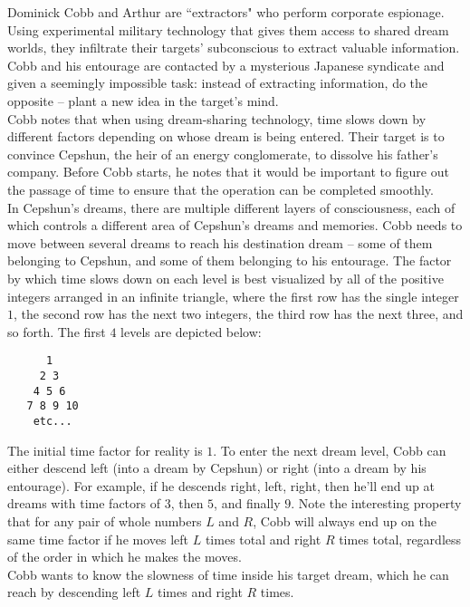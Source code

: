 
\noindent Dominick Cobb and Arthur are ``extractors" who perform corporate espionage. Using experimental military technology that gives them access to shared dream worlds, they infiltrate their targets' subconscious to extract valuable information. Cobb and his entourage are contacted by a mysterious Japanese syndicate and given a seemingly impossible task: instead of extracting information, do the opposite -- plant a new idea in the target's mind.\\

Cobb notes that when using dream-sharing technology, time slows down by different factors depending on whose dream is being entered. Their target is to convince Cepshun, the heir of an energy conglomerate, to dissolve his father's company. Before Cobb starts, he notes that it would be important to figure out the passage of time to ensure that the operation can be completed smoothly.\\

In Cepshun's dreams, there are multiple different layers of consciousness, each of which controls a different area of Cepshun's dreams and memories. Cobb needs to move between several dreams to reach his destination dream -- some of them belonging to Cepshun, and some of them belonging to his entourage. The factor by which time slows down on each level is best visualized by all of the positive integers arranged in an infinite triangle, where the first row has the single integer $1$, the second row has the next two integers, the third row has the next three, and so forth. The first $4$ levels are depicted below:

\begin{verbatim}
      1
     2 3
    4 5 6
   7 8 9 10
    etc...
\end{verbatim}

The initial time factor for reality is $1$. To enter the next dream level, Cobb can either descend left (into a dream by Cepshun) or right (into a dream by his entourage). For example, if he descends right, left, right, then he'll end up at dreams with time factors of $3$, then $5$, and finally $9$. Note the interesting property that for any pair of whole numbers $L$ and $R$, Cobb will always end up on the same time factor if he moves left $L$ times total and right $R$ times total, regardless of the order in which he makes the moves.\\

Cobb wants to know the slowness of time inside his target dream, which he can reach by descending left $L$ times and right $R$ times.

